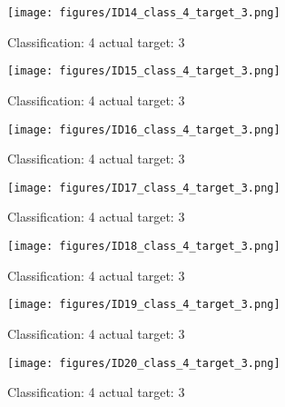 \begin{figure}[h!]
\begin{center}
\texttt{[image: figures/ID14\_class\_4\_target\_3.png]}
\end{center}
\caption{ Classification: 4 actual target: 3}
\label{fig:ID14_class_4_target_3}
\end{figure}
\begin{figure}[h!]
\begin{center}
\texttt{[image: figures/ID15\_class\_4\_target\_3.png]}
\end{center}
\caption{ Classification: 4 actual target: 3}
\label{fig:ID15_class_4_target_3}
\end{figure}
\begin{figure}[h!]
\begin{center}
\texttt{[image: figures/ID16\_class\_4\_target\_3.png]}
\end{center}
\caption{ Classification: 4 actual target: 3}
\label{fig:ID16_class_4_target_3}
\end{figure}
\begin{figure}[h!]
\begin{center}
\texttt{[image: figures/ID17\_class\_4\_target\_3.png]}
\end{center}
\caption{ Classification: 4 actual target: 3}
\label{fig:ID17_class_4_target_3}
\end{figure}
\begin{figure}[h!]
\begin{center}
\texttt{[image: figures/ID18\_class\_4\_target\_3.png]}
\end{center}
\caption{ Classification: 4 actual target: 3}
\label{fig:ID18_class_4_target_3}
\end{figure}
\begin{figure}[h!]
\begin{center}
\texttt{[image: figures/ID19\_class\_4\_target\_3.png]}
\end{center}
\caption{ Classification: 4 actual target: 3}
\label{fig:ID19_class_4_target_3}
\end{figure}
\begin{figure}[h!]
\begin{center}
\texttt{[image: figures/ID20\_class\_4\_target\_3.png]}
\end{center}
\caption{ Classification: 4 actual target: 3}
\label{fig:ID20_class_4_target_3}
\end{figure}
